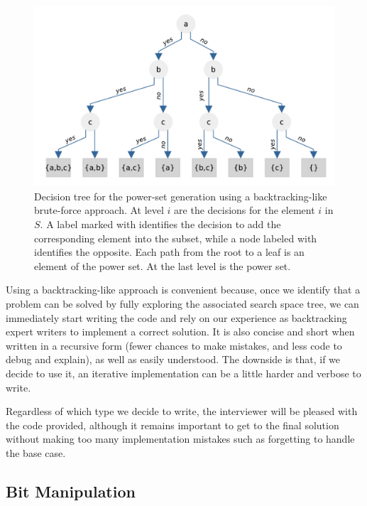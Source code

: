 \begin{figure}
    \centering
    \includegraphics[width=\textwidth]{sources/power_set/images/tree}
    \caption[Decision tree for the power-set generation using backtracking.]{Decision tree for the power-set generation using a backtracking-like brute-force approach. At level $i$ are the decisions for the element $i$ in $S$. A label marked with  identifies the decision to add the corresponding element into the subset, while a node labeled with  identifies the opposite. Each path from the root to a leaf is an element of the power set. At the last level is the power set.}
    \label{ref:power_set_decision_trees}
\end{figure}

Using a backtracking-like approach is convenient because, once we identify that a problem can be solved by fully exploring the associated search space tree, we can immediately
start writing the code and rely on our experience as backtracking expert writers to implement a correct
solution. It is also concise and short when written in a recursive  form (fewer chances to make mistakes, and less code to debug and explain),  as well
as easily understood.
The downside is that, if we decide to use it, an iterative implementation can be a little harder and verbose to write.

Regardless of which type we decide to write, the interviewer will be pleased with the code provided,  although it remains important to get to the final solution
without making too many implementation mistakes such as forgetting to handle the base case.


\subsection{Bit Manipulation}

